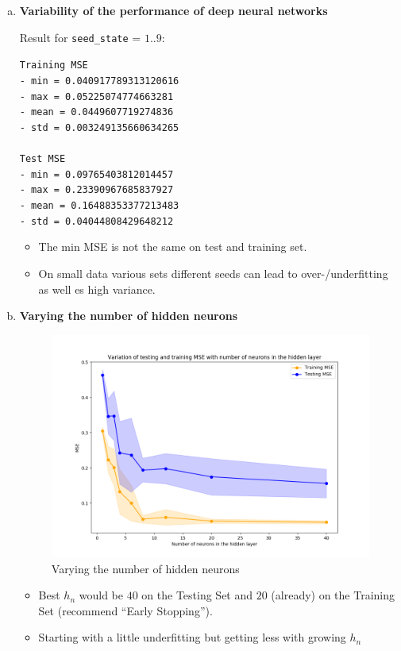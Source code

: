 \documentclass[12pt,a4paper]{article}
\begin{document}
\begin{enumerate}[a)]

  \item \textbf{Variability of the performance of deep neural networks}

Result for \texttt{seed\_state} = $1..9$:


\texttt{Training MSE \\
- min = 0.040917789313120616 \\
- max = 0.05225074774663281 \\
- mean = 0.0449607719274836 \\
- std = 0.003249135660634265 \\
\\
Test MSE \\
- min = 0.09765403812014457 \\
- max = 0.23390967685837927 \\
- mean = 0.16488353377213483 \\
- std = 0.04044808429648212\\
}

\begin{itemize}
  \item The min MSE is not the same on test and training set.
  \item On small data various sets different seeds can lead to
  over-/underfitting as well es high variance.
\end{itemize}

  \item \textbf{Varying the number of hidden neurons}
  
\begin{figure}[H]
	\centering
  \includegraphics[width=\textwidth]{figures/1_1_c.png}
	\caption{Varying the number of hidden neurons}
	\label{1_1_c}
\end{figure}

\begin{itemize}
  \item Best $h_n$ would be $40$ on the Testing Set and $20$ (already) on the
  Training Set (recommend ``Early Stopping'').
  \item Starting with a little underfitting but getting less with growing $h_n$
\end{itemize}

\end{enumerate}
\end{document}
